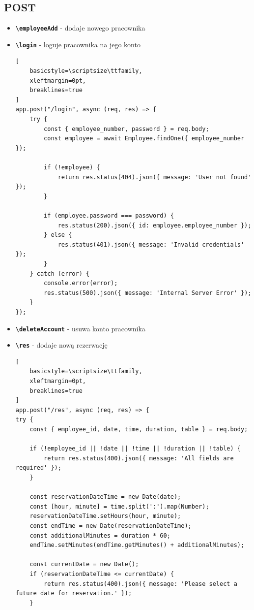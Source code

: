 \documentclass[12pt]{article}
\begin{document}
\subsection{POST}
\begin{itemize}
    \item \textbf{\texttt{\textbackslash employeeAdd}} - dodaje nowego pracownika
    \item \textbf{\texttt{\textbackslash login}} - loguje pracownika na jego konto
\begin{lstlisting}[
    basicstyle=\scriptsize\ttfamily,
    xleftmargin=0pt,
    breaklines=true
]
app.post("/login", async (req, res) => {
    try {
        const { employee_number, password } = req.body;
        const employee = await Employee.findOne({ employee_number });

        if (!employee) {
            return res.status(404).json({ message: 'User not found' });
        }

        if (employee.password === password) {
            res.status(200).json({ id: employee.employee_number });
        } else {
            res.status(401).json({ message: 'Invalid credentials' });
        }
    } catch (error) {
        console.error(error);
        res.status(500).json({ message: 'Internal Server Error' });
    }
});
\end{lstlisting}
    \item \textbf{\texttt{\textbackslash deleteAccount}} - usuwa konto pracownika
    \newpage
    \item \textbf{\texttt{\textbackslash res}} - dodaje nową rezerwację
\begin{lstlisting}[
    basicstyle=\scriptsize\ttfamily,
    xleftmargin=0pt,
    breaklines=true
]
app.post("/res", async (req, res) => {
try {
    const { employee_id, date, time, duration, table } = req.body;

    if (!employee_id || !date || !time || !duration || !table) {
        return res.status(400).json({ message: 'All fields are required' });
    }

    const reservationDateTime = new Date(date);
    const [hour, minute] = time.split(':').map(Number);
    reservationDateTime.setHours(hour, minute);
    const endTime = new Date(reservationDateTime);
    const additionalMinutes = duration * 60;
    endTime.setMinutes(endTime.getMinutes() + additionalMinutes);

    const currentDate = new Date();
    if (reservationDateTime <= currentDate) {
        return res.status(400).json({ message: 'Please select a future date for reservation.' });
    }


\end{lstlisting}
\end{itemize}
\end{document}
